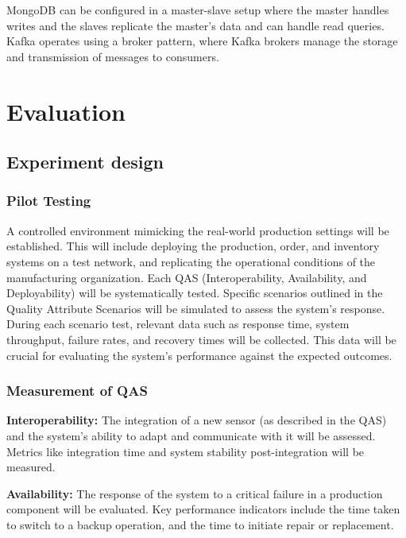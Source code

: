 \documentclass[conference]{IEEEtran}
\begin{document}
MongoDB can be configured in a master-slave setup where the master handles writes and the slaves replicate the master's data and can handle read queries.
Kafka operates using a broker pattern, where Kafka brokers manage the storage and transmission of messages to consumers.

\section{Evaluation}
\label{sec:evaluation}


 
\subsection{Experiment design}
\label{sec:design}
\subsubsection*{Pilot Testing}

A controlled environment mimicking the real-world production settings will be established. This will include deploying the production, order, and inventory systems on a test network, and replicating the operational conditions of the manufacturing organization. Each QAS (Interoperability, Availability, and Deployability) will be systematically tested. Specific scenarios outlined in the Quality Attribute Scenarios will be simulated to assess the system's response. During each scenario test, relevant data such as response time, system throughput, failure rates, and recovery times will be collected. This data will be crucial for evaluating the system's performance against the expected outcomes.

\subsubsection*{Measurement of QAS}

\textbf{Interoperability:} The integration of a new sensor (as described in the QAS) and the system's ability to adapt and communicate with it will be assessed. Metrics like integration time and system stability post-integration will be measured.

\textbf{Availability:} The response of the system to a critical failure in a production component will be evaluated. Key performance indicators include the time taken to switch to a backup operation, and the time to initiate repair or replacement.
\end{document}
